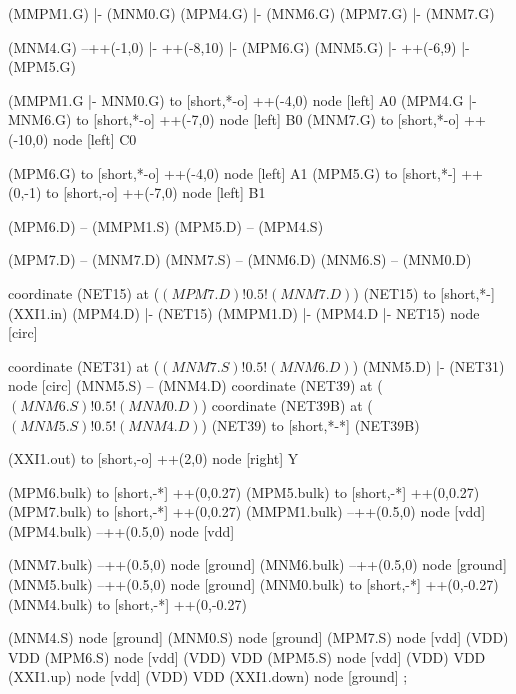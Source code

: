 \begin{circuitikz}[american]

	(MMPM1.G) |- (MNM0.G)
	(MPM4.G) |- (MNM6.G)
	(MPM7.G) |- (MNM7.G)
	
	(MNM4.G) --++(-1,0) |- ++(-8,10) |- (MPM6.G)	
	(MNM5.G) |- ++(-6,9) |- (MPM5.G)
	
	(MMPM1.G |- MNM0.G) to [short,*-o] ++(-4,0)  node [left] {A0}
	(MPM4.G |- MNM6.G) to [short,*-o] ++(-7,0)  node [left] {B0}
	(MNM7.G) to [short,*-o] ++(-10,0) node [left] {C0}
	
	(MPM6.G) to [short,*-o] ++(-4,0) node [left] {A1}	
	(MPM5.G) to [short,*-] ++(0,-1) to [short,-o] ++(-7,0) node [left] {B1}
	
	(MPM6.D) -- (MMPM1.S)
	(MPM5.D) -- (MPM4.S)
	
	(MPM7.D) -- (MNM7.D)
	(MNM7.S) -- (MNM6.D)
	(MNM6.S) -- (MNM0.D)
	
	coordinate (NET15) at ($(MPM7.D)!0.5!(MNM7.D)$)
	(NET15) to [short,*-] (XXI1.in)
	(MPM4.D) |- (NET15)
	(MMPM1.D) |- (MPM4.D |- NET15) node [circ] {}
	
	coordinate (NET31) at ($(MNM7.S)!0.5!(MNM6.D)$)
	(MNM5.D) |- (NET31) node [circ] {}
	(MNM5.S) -- (MNM4.D)
	coordinate (NET39) at ($(MNM6.S)!0.5!(MNM0.D)$)
	coordinate (NET39B) at ($(MNM5.S)!0.5!(MNM4.D)$)
	(NET39) to [short,*-*] (NET39B)
	
	(XXI1.out) to [short,-o] ++(2,0) node [right] {Y}
	
	(MPM6.bulk) to [short,-*] ++(0,0.27)
	(MPM5.bulk) to [short,-*] ++(0,0.27)	
	(MPM7.bulk) to [short,-*] ++(0,0.27)	
	(MMPM1.bulk) --++(0.5,0) node [vdd]{}
	(MPM4.bulk) --++(0.5,0) node [vdd]{}
	
	
	(MNM7.bulk) --++(0.5,0) node [ground]{}
	(MNM6.bulk) --++(0.5,0) node [ground]{}
	(MNM5.bulk) --++(0.5,0) node [ground]{}
	(MNM0.bulk) to [short,-*] ++(0,-0.27)
	(MNM4.bulk) to [short,-*] ++(0,-0.27)


	(MNM4.S) node [ground] {}
	(MNM0.S) node [ground] {}
	(MPM7.S) node [vdd] (VDD) {VDD}
	(MPM6.S) node [vdd] (VDD) {VDD}
	(MPM5.S) node [vdd] (VDD) {VDD}
	(XXI1.up) node [vdd] (VDD) {VDD}
	(XXI1.down) node [ground] {}
;

\end{circuitikz}
